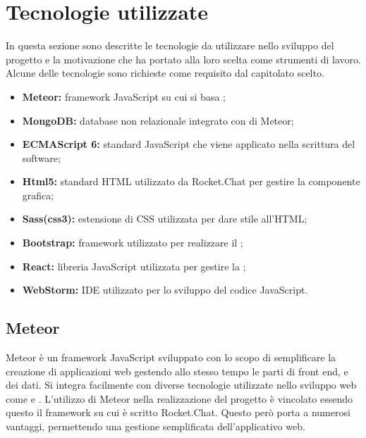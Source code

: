 \section{Tecnologie utilizzate}
In questa sezione sono descritte le tecnologie da utilizzare nello sviluppo del progetto \ProjectName{} e la motivazione che ha portato alla loro scelta come strumenti di lavoro. Alcune delle tecnologie sono richieste come requisito dal capitolato scelto.
\begin{itemize}
	\item \textbf{Meteor:} framework JavaScript su cui si basa ;
	\item \textbf{MongoDB:} database non relazionale integrato con di Meteor;
	\item \textbf{ECMAScript 6:} standard JavaScript che viene applicato nella scrittura del software;
	\item \textbf{Html5:} standard HTML utilizzato da Rocket.Chat per gestire la componente grafica;
	\item \textbf{Sass(css3):} estensione di CSS utilizzata per dare stile all'HTML; 
	\item \textbf{Bootstrap:} framework utilizzato per realizzare il ;
	\item \textbf{React:} libreria JavaScript utilizzata per gestire la ;
	\item \textbf{WebStorm:} IDE utilizzato per lo sviluppo del codice JavaScript.
\end{itemize}

\subsection{Meteor}
Meteor è un framework JavaScript sviluppato con lo scopo di semplificare la creazione di applicazioni web gestendo allo stesso tempo le parti di front end,  e dei dati. Si integra facilmente con diverse tecnologie utilizzate nello sviluppo web come  e .
L'utilizzo di Meteor nella realizzazione del progetto è vincolato essendo questo il framework su cui è scritto Rocket.Chat. Questo però porta a numerosi vantaggi, permettendo una gestione semplificata dell'applicativo web.

